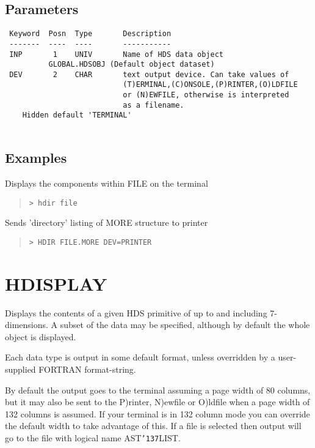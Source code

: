 \documentclass{book}
\renewcommand{\_}{{\tt\char'137}}     %
\begin{document}
\subsection{Parameters}
\begin{verbatim}
 Keyword  Posn  Type       Description
 -------  ----  ----       -----------
 INP       1    UNIV       Name of HDS data object
          GLOBAL.HDSOBJ (Default object dataset)
 DEV       2    CHAR       text output device. Can take values of
                           (T)ERMINAL,(C)ONSOLE,(P)RINTER,(O)LDFILE
                           or (N)EWFILE, otherwise is interpreted
                           as a filename.
    Hidden default 'TERMINAL'
 
\end{verbatim}\subsection{Examples}
Displays the components within FILE on the terminal
\begin{quote}\begin{verbatim}
> hdir file
\end{verbatim}\end{quote}
Sends 'directory' listing of MORE structure to printer
\begin{quote}\begin{verbatim}
> HDIR FILE.MORE DEV=PRINTER
\end{verbatim}\end{quote}
\section{HDISPLAY}
Displays the contents of a given HDS primitive of up to and
including 7-dimensions. A subset of the data may be specified,
although by default the whole object is displayed.
 
Each data type is output in some default format, unless
overridden by a user-supplied FORTRAN format-string.
 
By default the output goes to the terminal assuming a page width
of 80 columns, but it may also be sent to the P)rinter, N)ewfile
or O)ldfile when a page width of 132 columns is assumed. If your
terminal is in 132 column mode you can override the default width
to take advantage of this. If a file is selected then output will
go to the file with logical name AST\_LIST.
 
\end{document}
